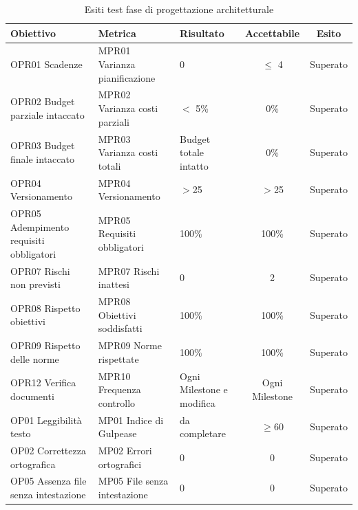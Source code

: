 \documentclass[../piano_di_qualifica.tex]{subfiles}
\begin{document}
\begin{table}[!ht]
	\centering
	\begin{tabular}{|p{4cm}|p{4cm}|l|c|c|}
		\hline
		\rowcolor{lightgray}
		\textbf{Obiettivo}            			& \textbf{Metrica}              & \textbf{Risultato}                    & \textbf{Accettabile} & \textbf{Esito} \\
		\hline
		OPR01 Scadenze		        			& MPR01 Varianza pianificazione & 0                             		& $\leq$ 4           	& Superato   	\\
		OPR02 Budget parziale intaccato        	& MPR02 Varianza costi parziali & $<$ 5\%								& 0\%                 	& Superato   	\\
		OPR03 Budget finale intaccato        	& MPR03 Varianza costi totali   & Budget totale intatto					& 0\%                  	& Superato      \\
		OPR04 Versionamento						& MPR04 Versionamento			& $>$25									& $>$25					& Superato		\\
		OPR05 Adempimento requisiti obbligatori & MPR05 Requisiti obbligatori 	& 100\%									& 100\%					& Superato		\\
		OPR07 Rischi non previsti				& MPR07 Rischi inattesi			& 0										& 2						& Superato	 	\\
		OPR08 Rispetto obiettivi      			& MPR08 Obiettivi soddisfatti   & 100\%                                 & 100\%                	& Superato      \\
		OPR09 Rispetto delle norme   			& MPR09 Norme rispettate        & 100\%                                 & 100\%                	& Superato      \\
		OPR12 Verifica documenti      			& MPR10 Frequenza controllo     & Ogni Milestone e modifica         	& Ogni Milestone       	& Superato      \\
		OP01 Leggibilità testo       			& MP01 Indice di Gulpease      	& da completare                         & \(\ge 60\)           	& Superato      \\
		OP02 Correttezza ortografica 			& MP02 Errori ortografici      	& 0                                     & 0                    	& Superato      \\
		OP05 Assenza file senza intestazione	& MP05 File senza intestazione 	& 0										& 0						& Superato		\\
		\hline
	\end{tabular}
	\caption{Esiti test fase di progettazione architetturale}
\end{table}
\end{document}
